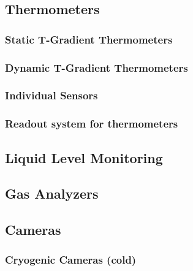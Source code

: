 \subsection{Thermometers}
\label{sec:fdsp-slow-cryo-therm}


\subsubsection{Static T-Gradient Thermometers}

\subsubsection{Dynamic T-Gradient Thermometers}

\subsubsection{Individual Sensors}

\subsubsection{Readout system for thermometers}


\subsection{Liquid Level Monitoring}
\label{sec:fdsp-slow-cryo-liq-lev}

\subsection{Gas Analyzers}
\label{sec:fdsp-slow-cryo-gas-anlyz}

\subsection{Cameras}
\label{sec:fdsp-slow-cryo-cameras}

\subsubsection{Cryogenic Cameras (cold)}

